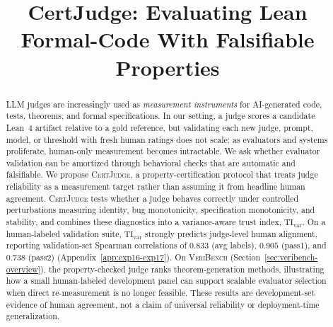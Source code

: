 \documentclass{article}
\title{CertJudge: Evaluating Lean Formal-Code With Falsifiable Properties}
\author{}
\begin{document}
\ifcolmsubmission
\linenumbers
\fi

\maketitle
{}

\begin{abstract}
  LLM judges are increasingly used as \emph{measurement instruments} for AI-generated code, tests, theorems, and formal specifications. In our setting, a judge scores a candidate Lean~4 artifact relative to a gold reference, but validating each new judge, prompt, model, or threshold with fresh human ratings does not scale: as evaluators and systems proliferate, human-only measurement becomes intractable. We ask whether evaluator validation can be amortized through behavioral checks that are automatic and falsifiable. We propose \textsc{CertJudge}, a property-certification protocol that treats judge reliability as a measurement target rather than assuming it from headline human agreement. \textsc{CertJudge} tests whether a judge behaves correctly under controlled perturbations measuring identity, bug monotonicity, specification monotonicity, and stability, and combines these diagnostics into a variance-aware trust index, \(\mathrm{TI}_{\mathrm{var}}\). On a human-labeled validation suite, \(\mathrm{TI}_{\mathrm{var}}\) strongly predicts judge-level human alignment, reporting validation-set Spearman correlations of \(0.833\) (avg labels), \(0.905\) (pass1), and \(0.738\) (pass2) (Appendix~\ref{app:exp16-exp17}). On \textsc{VeriBench} (Section~\ref{sec:veribench-overview}), the property-checked judge ranks theorem-generation methods, illustrating how a small human-labeled development panel can support scalable evaluator selection when direct re-measurement is no longer feasible. These results are development-set evidence of human agreement, not a claim of universal reliability or deployment-time generalization.


\end{abstract}
\end{document}
